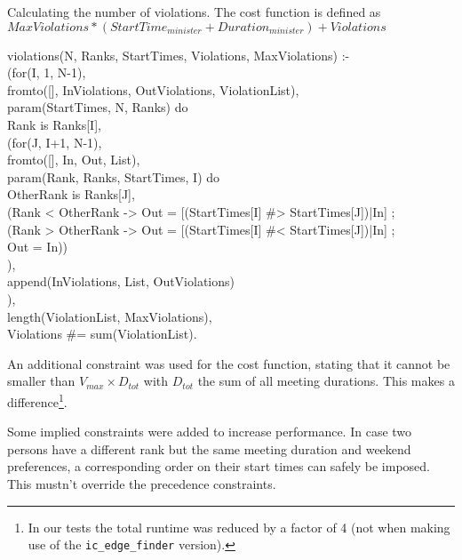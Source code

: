 \begin{snippet}[H]
\caption{Calculating the number of violations. The cost function is defined as $MaxViolations * (StartTime_{minister} + Duration_{minister}) + Violations$}\label{cost}
\small
violations(N, Ranks, StartTimes, Violations, MaxViolations) :-\\
    \qquad(for(I, 1, N-1),\\
     \qquad fromto([], InViolations, OutViolations, ViolationList),\\
     \qquad param(StartTimes, N, Ranks) do \\
        \qquad\qquad Rank is Ranks[I], \\
        \qquad\qquad (for(J, I+1, N-1), \\
         \qquad\qquad fromto([], In, Out, List), \\
         \qquad\qquad param(Rank, Ranks, StartTimes, I) do \\
            \qquad\qquad\qquad OtherRank is Ranks[J], \\
            \qquad\qquad\qquad (Rank < OtherRank -> Out = [(StartTimes[I] \#> StartTimes[J])|In] ; \\
            \qquad\qquad\qquad (Rank > OtherRank -> Out = [(StartTimes[I] \#< StartTimes[J])|In] ; \\
            \qquad\qquad\qquad Out = In)) \\
        \qquad\qquad ), \\
       \qquad\qquad append(InViolations, List, OutViolations) \\
    \qquad), \\
    \qquad length(ViolationList, MaxViolations), \\
    \qquad Violations \#= sum(ViolationList).
\end{snippet}

An additional constraint was used for the cost function, stating that it cannot be smaller than $V_{max}\times D_{tot}$ with $D_{tot}$ the sum of all meeting durations. This makes a difference\footnote{In our tests the total runtime was reduced by a factor of 4 (not when making use of the \texttt{ic\_edge\_finder} version).}.\\\par

Some implied constraints were added to increase performance. In case two persons have a different rank but the same meeting duration and weekend preferences, a corresponding order on their start times can safely be imposed. This mustn't override the precedence constraints.\\\par


